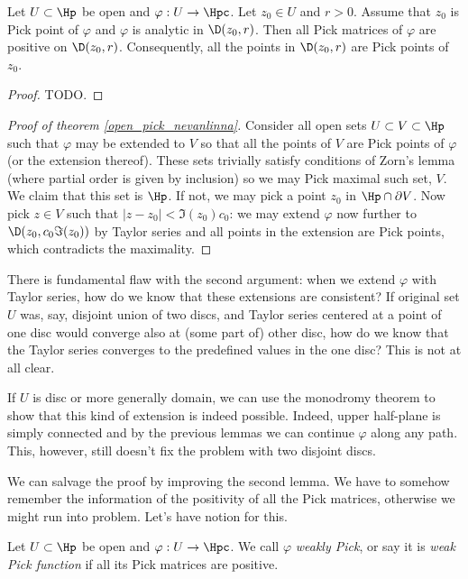 \begin{lem}\label{pick_point_lemma}
	Let $U \subset \Hp$ be open and $\varphi : U \to \Hpc$. Let $z_{0} \in U$ and $r > 0$. Assume that $z_{0}$ is Pick point of $\varphi$ and $\varphi$ is analytic in $\D(z_{0}, r)$. Then all Pick matrices of $\varphi$ are positive on $\D(z_{0}, r)$. Consequently, all the points in $\D(z_{0}, r)$ are Pick points of $z_{0}$.
\end{lem}
\begin{proof}
	TODO.
\end{proof}

\begin{proof}[Proof of theorem \ref{open_pick_nevanlinna}]
	Consider all open sets $U \subset V \subset \Hp$ such that $\varphi$ may be extended to $V$ so that all the points of $V$ are Pick points of $\varphi$ (or the extension thereof). These sets trivially satisfy conditions of Zorn's lemma (where partial order is given by inclusion) so we may Pick maximal such set, $V$. We claim that this set is $\Hp$. If not, we may pick a point $z_{0}$ in $\Hp \cap \partial V$. Now pick $z \in V$ such that $|z - z_{0}| < \Im(z_{0}) c_{0}$: we may extend $\varphi$ now further to $\D(z_{0}, c_{0} \Im(z_{0}))$ by Taylor series and all points in the extension are Pick points, which contradicts the maximality.
\end{proof}

There is fundamental flaw with the second argument: when we extend $\varphi$ with Taylor series, how do we know that these extensions are consistent? If original set $U$ was, say, disjoint union of two discs, and Taylor series centered at a point of one disc would converge also at (some part of) other disc, how do we know that the Taylor series converges to the predefined values in the one disc? This is not at all clear.

If $U$ is disc or more generally domain, we can use the monodromy theorem to show that this kind of extension is indeed possible. Indeed, upper half-plane is simply connected and by the previous lemmas we can continue $\varphi$ along any path. This, however, still doesn't fix the problem with two disjoint discs.

We can salvage the proof by improving the second lemma. We have to somehow remember the information of the positivity of all the Pick matrices, otherwise we might run into problem. Let's have notion for this.

\begin{maar}
	Let $U \subset \Hp$ be open and $\varphi : U \to \Hpc$. We call $\varphi$ \textit{weakly Pick}, or say it is \textit{weak Pick function} if all its Pick matrices are positive.
\end{maar}

